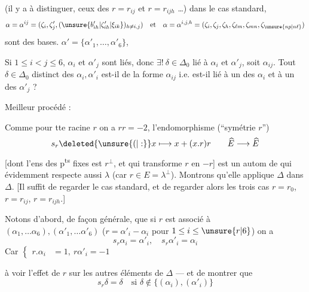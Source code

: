 (il y a   à distinguer, ceux des $r=r_{ij}$ et $r=r_{ijh}$ \ldots) dans le cas standard,
\[
\alpha=\alpha^{ij}=(\zeta_i,\zeta'_j,(\unsure{b'_{ih}|\zeta'_{ih}|\xi_{ik}})_{h\ne i,j})\quad\text{et}\quad
\alpha=\alpha^{i,j,h}=(\zeta_i,\zeta_j,\zeta_h,\zeta_{\ell m},\zeta_{mn},\zeta_{\unsure{np|n\ell}})
\]
sont des bases.     $\alpha'=\{\alpha'_1,\ldots,\alpha'_6\}$,


Si $1\le i<j\le6$, \deleted{$\unsure{\delta}$}$\alpha_i$ et $\alpha'_j$ sont liés, donc $\exists!\ \delta\in\Delta_0$ lié à $\alpha_i$ et $\alpha'_j$, soit $\alpha_{ij}$.  Tout $\delta\in\Delta_0$ distinct des $\alpha_i,\alpha'_i$ est-il de la forme $\alpha_{ij}$ i.e. est-il lié à un des $\alpha_i$ et à un des $\alpha'_j$ ? 

 Meilleur procédé :

Comme pour tte racine $r$ on a $rr=-2$, l'endomorphisme (``symétrie  $r$'')
\[
s_r\deleted{\unsure{(|:}}x\longmapsto x+(x.r)r\qquad\widehat E\longrightarrow\widehat E
\]
[dont l'ens des p\textsuperscript{ts} fixes est $r^\perp$, et qui transforme $r$ en $-r$] est un autom de   qui évidemment respecte aussi $\lambda$ (car $r\in E=\lambda^\perp$). Montrons qu'elle applique $\Delta$ dans $\Delta$. [Il suffit de regarder le cas standard, et de regarder alors les trois cas $r=r_0$, $r=r_{ij}$, $r=r_{ijh}$.]

 Notons d'abord, de façon générale, que si $r$ est associé à $(\alpha_1,\ldots\alpha_6),(\alpha'_1,\ldots\alpha'_6)$ ($r=\alpha'_i-\alpha_i$ pour $1\le i\le\unsure{r|6}$) on a
\[
\boxed{s_r\alpha_i=\alpha'_i,\quad s_r\alpha'_i=\alpha_i}
\]
Car $\left\{\begin{aligned}r.\alpha_i&=1,\ r\alpha'_i=-1\end{aligned}\right.$

 à voir l'effet de $r$ sur les autres éléments de $\Delta$ --- et de montrer que
\[
\boxed{s_r\delta=\delta\quad\text{si }\delta\notin\{(\alpha_i),(\alpha'_i)\}}
\]
